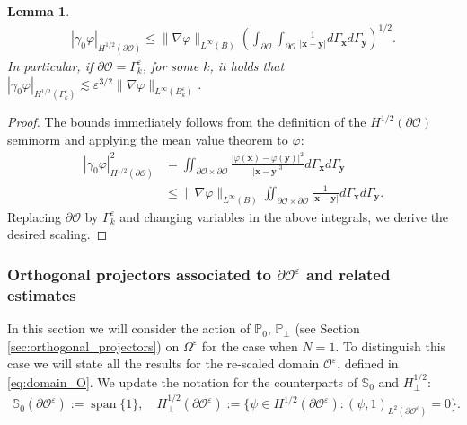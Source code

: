\documentclass[]{article}
\newtheorem{lemma}{Lemma}
\numberwithin{equation}{section}
\numberwithin{theorem}{section}
\numberwithin{lemma}{section}
\numberwithin{corollary}{section}
\numberwithin{proposition}{section}
\numberwithin{definition}{section}
\newcommand{\bx}{\boldsymbol{x}}
\newcommand{\by}{\boldsymbol{y}}
\newcommand{\re}{\varepsilon}
\renewcommand{\O}{\mathcal{O}}
\newcommand{\bO}{\partial\O}
\renewcommand{\vec}{\boldsymbol}
\begin{document}
\begin{appendices}
\begin{lemma}
			\begin{align*}%
				|\gamma_0 \varphi|_{H^{1/2}(\partial\mathcal{O})}\leq \|\nabla \varphi\|_{L^{\infty}(B)}\left(\int_{\partial\mathcal{O}}\int_{\partial\mathcal{O}}\frac{1}{| \vec{x}-\vec{y} |}d\Gamma_{\vec{x}}d\Gamma_{\vec{y}}\right)^{1/2}.
			\end{align*}
			In particular, if $\partial\mathcal{O}=\Gamma^{\re}_k$, for some $k$, it holds that $|\gamma_0 \varphi|_{H^{1/2}(\Gamma^{\re}_k)} \lesssim \re^{3/2} \|\nabla \varphi\|_{L^{\infty}(B^{\re}_k)}$. 
		\end{lemma}
		\begin{proof}
			The bounds immediately follows from  the definition of the $H^{1/2} (\bO)$ seminorm and applying the mean value theorem to $\varphi$:
			\begin{align*}
				|\gamma_0 \varphi|^2_{H^{1/2}(\bO)}  &= \iint_{\bO \times \bO} \frac{|\varphi(\bx) - \varphi (\by)|^2}{|\bx - \by|^3} d\Gamma_{\bx} d\Gamma_{\by}\\ &\leq \| \nabla \varphi \|_{L^{\infty}(B)} \iint_{\bO \times \bO} \frac{1}{|\bx - \by|} d\Gamma_{\bx} d\Gamma_{\by}.
			\end{align*}
			Replacing $\bO$ by $\Gamma^{\re}_k$ and changing variables in the above integrals, we derive the desired scaling.
		\end{proof}
		\subsubsection*{Orthogonal projectors associated to $\partial \mathcal{O}^{\re}$ and related estimates}  In this section we will consider the action of $\mathbb{P}_0$, $\mathbb{P}_{\perp}$ (see Section \ref{sec:orthogonal_projectors}) on $\Omega^{\re}$ for the case when $N=1$. To distinguish this case we will state all the results for the re-scaled domain $\mathcal{O}^{\re}$, defined in \eqref{eq:domain_O}. We  update the notation for the counterparts of $\mathbb{S}_0$ and $H^{1/2}_{\perp}$: 
		\begin{align*}%
			\mathbb{S}_0(\partial \mathcal{O}^{\re}) := \operatorname{span}\{1\}, \quad H^{1/2}_{\perp}(\partial \mathcal{O}^{\re}) := \{ \psi \in H^{1/2}(\partial \mathcal{O}^{\re}) : (\psi, 1)_{L^2(\partial \mathcal{O}^{\re})} = 0 \}.
		\end{align*} 
		
		

\end{appendices}
\end{document}
